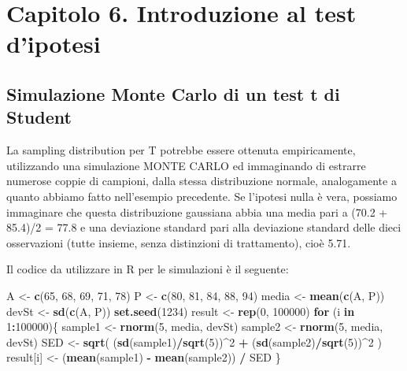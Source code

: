 \documentclass[a4paper,12pt,oneside]{book}
\newenvironment{Shaded}{\begin{snugshade}}{\end{snugshade}}
\newcommand{\KeywordTok}[1]{\textcolor[rgb]{0.13,0.29,0.53}{\textbf{#1}}}
\newcommand{\DecValTok}[1]{\textcolor[rgb]{0.00,0.00,0.81}{#1}}
\newcommand{\StringTok}[1]{\textcolor[rgb]{0.31,0.60,0.02}{#1}}
\newcommand{\ControlFlowTok}[1]{\textcolor[rgb]{0.13,0.29,0.53}{\textbf{#1}}}
\newcommand{\OperatorTok}[1]{\textcolor[rgb]{0.81,0.36,0.00}{\textbf{#1}}}
\newcommand{\NormalTok}[1]{#1}
\theoremstyle{definition}
\theoremstyle{definition}
\theoremstyle{definition}
\theoremstyle{remark}
\begin{document}
\section{Capitolo 6. Introduzione al test
d'ipotesi}\label{capitolo-6.-introduzione-al-test-dipotesi}

\subsection{Simulazione Monte Carlo di un test t di
Student}\label{simulazione-monte-carlo-di-un-test-t-di-student}

La sampling distribution per T potrebbe essere ottenuta empiricamente,
utilizzando una simulazione MONTE CARLO ed immaginando di estrarre
numerose coppie di campioni, dalla stessa distribuzione normale,
analogamente a quanto abbiamo fatto nell'esempio precedente. Se
l'ipotesi nulla è vera, possiamo immaginare che questa distribuzione
gaussiana abbia una media pari a (70.2 + 85.4)/2 = 77.8 e una deviazione
standard pari alla deviazione standard delle dieci osservazioni (tutte
insieme, senza distinzioni di trattamento), cioè 5.71.

Il codice da utilizzare in R per le simulazioni è il seguente:

\begin{Shaded}
\begin{Highlighting}[]
\NormalTok{A <-}\StringTok{ }\KeywordTok{c}\NormalTok{(}\DecValTok{65}\NormalTok{, }\DecValTok{68}\NormalTok{, }\DecValTok{69}\NormalTok{, }\DecValTok{71}\NormalTok{, }\DecValTok{78}\NormalTok{)}
\NormalTok{P <-}\StringTok{ }\KeywordTok{c}\NormalTok{(}\DecValTok{80}\NormalTok{, }\DecValTok{81}\NormalTok{, }\DecValTok{84}\NormalTok{, }\DecValTok{88}\NormalTok{, }\DecValTok{94}\NormalTok{)}
\NormalTok{media <-}\StringTok{ }\KeywordTok{mean}\NormalTok{(}\KeywordTok{c}\NormalTok{(A, P))}
\NormalTok{devSt <-}\StringTok{ }\KeywordTok{sd}\NormalTok{(}\KeywordTok{c}\NormalTok{(A, P))}
\KeywordTok{set.seed}\NormalTok{(}\DecValTok{1234}\NormalTok{)}
\NormalTok{result <-}\StringTok{ }\KeywordTok{rep}\NormalTok{(}\DecValTok{0}\NormalTok{, }\DecValTok{100000}\NormalTok{)}
\ControlFlowTok{for}\NormalTok{ (i }\ControlFlowTok{in} \DecValTok{1}\OperatorTok{:}\DecValTok{100000}\NormalTok{)\{}
\NormalTok{  sample1 <-}\StringTok{ }\KeywordTok{rnorm}\NormalTok{(}\DecValTok{5}\NormalTok{, media, devSt)}
\NormalTok{  sample2 <-}\StringTok{ }\KeywordTok{rnorm}\NormalTok{(}\DecValTok{5}\NormalTok{, media, devSt)}
\NormalTok{  SED <-}\StringTok{ }\KeywordTok{sqrt}\NormalTok{( (}\KeywordTok{sd}\NormalTok{(sample1)}\OperatorTok{/}\KeywordTok{sqrt}\NormalTok{(}\DecValTok{5}\NormalTok{))}\OperatorTok{^}\DecValTok{2} \OperatorTok{+}
\StringTok{                 }\NormalTok{(}\KeywordTok{sd}\NormalTok{(sample2)}\OperatorTok{/}\KeywordTok{sqrt}\NormalTok{(}\DecValTok{5}\NormalTok{))}\OperatorTok{^}\DecValTok{2}\NormalTok{ )}
\NormalTok{  result[i] <-}\StringTok{ }\NormalTok{(}\KeywordTok{mean}\NormalTok{(sample1) }\OperatorTok{-}\StringTok{ }\KeywordTok{mean}\NormalTok{(sample2)) }\OperatorTok{/}\StringTok{ }\NormalTok{SED}
\NormalTok{\}}
\end{Highlighting}
\end{Shaded}
\end{document}
